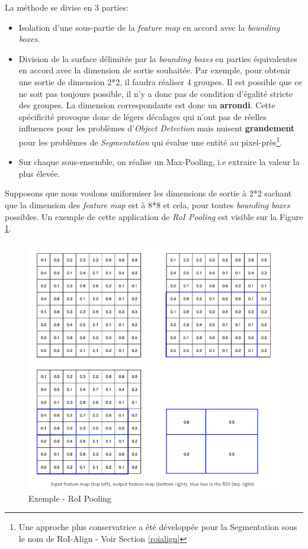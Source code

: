 \noindent La méthode se divise en 3 parties:
\begin{itemize}
    \item Isolation d'une sous-partie de la \textit{feature map} en accord avec la \textit{bounding boxes}.
    \item Division de la surface délimitée par la \textit{bounding boxes} en parties équivalentes en accord avec la dimension de sortie souhaitée. Par exemple, pour obtenir une sortie de dimension 2*2, il faudra réaliser 4 groupes. Il est possible que ce ne soit pas toujours possible, il n'y a donc pas de condition d'égalité stricte des groupes. La dimension correspondante est donc un \textbf{arrondi}. Cette spécificité provoque donc de légers décalages qui n'ont pas de réelles influences pour les problèmes d'\textit{Object Detection} mais nuisent \textbf{grandement} pour les problèmes de \textit{Segmentation} qui évalue une entité au pixel-près\footnote{Une approche plus conservatrice a été développée pour la Segmentation sous le nom de RoI-Align - Voir Section \ref{roialign}}.
    \item Sur chaque sous-ensemble, on réalise un Max-Pooling, i.e extraire la valeur la plus élevée.
\end{itemize}

\noindent Supposons que nous voulons uniformiser les dimensions de sortie à 2*2 sachant que la dimension des \textit{feature map} est à 8*8 et cela, pour toutes \textit{bounding boxes} possibles. Un exemple de cette application de \textit{RoI Pooling} est visible sur la Figure \ref{roi}.

\begin{figure}
    \centering
    \includegraphics[scale=0.3]{./tex/computer-vision/object-recognition/roi.png}
    \caption{Exemple - RoI Pooling}
    \label{roi}
\end{figure}


